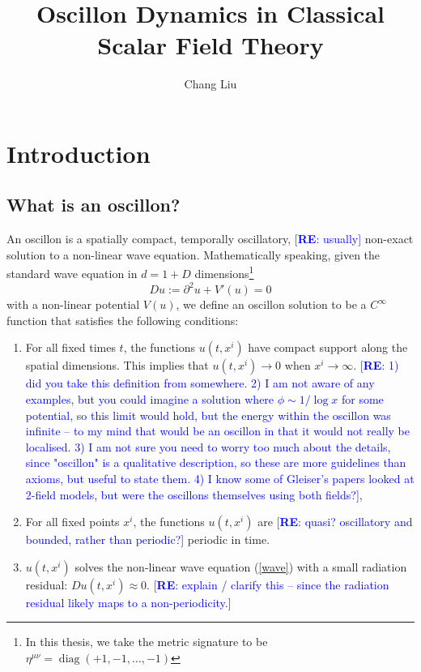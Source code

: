 \documentclass{report}
\newcommand{\re}[1]{\textcolor{blue}{[{\bf RE}: #1]}}
\DeclareMathOperator{\diag}{diag}
\begin{document}
\title{Oscillon Dynamics in Classical\\ Scalar Field Theory}
\author{Chang Liu}
\maketitle

\tableofcontents

\chapter{Introduction}
\section{What is an oscillon?}
An oscillon is a spatially compact, temporally oscillatory, \re{usually} non-exact solution to a non-linear wave equation. Mathematically speaking, given the standard wave equation in $d=1+D$ dimensions\footnote{In this thesis, we take the metric signature to be $\eta^{\mu\nu} = \diag(+1,-1,\ldots,-1)$}
\begin{equation}\label{wave}
  Du := \partial^2 u + V'(u) = 0
\end{equation}
with a non-linear potential $V(u)$, we define an oscillon solution to be a $C^\infty$ function that satisfies the following conditions:
\begin{enumerate}
\item For all fixed times $t$, the functions $u(t, x^i)$ have compact support along the spatial dimensions. This implies that $u(t,x^i)\to0$ when $x^i \to \infty$. \re{1) did you take this definition from somewhere. 2) I am not aware of any examples, but you could imagine a solution where $\phi \sim 1/\log{x}$ for some potential, so this limit would hold, but the energy within the oscillon was infinite -- to my mind that would be an oscillon in that it would not really be localised. 3) I am not sure you need to worry too much about the details, since "oscillon" is a qualitative description, so these are more guidelines than axioms, but useful to state them. 4) I know some of Gleiser's papers looked at 2-field models, but were the oscillons themselves using both fields?}, 
\item For all fixed points $x^i$, the functions $u(t, x^i)$ are \re{quasi? oscillatory and bounded, rather than periodic?} periodic in time.
\item $u(t,x^i)$ solves the non-linear wave equation (\ref{wave}) with a small radiation residual: $Du(t,x^i) \approx 0$. \re{explain / clarify this -- since the radiation residual likely maps to a non-periodicity.}
\end{enumerate}
\end{document}
